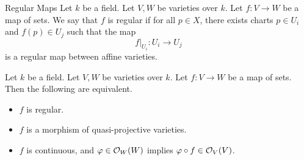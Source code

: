 \documentclass[a4paper]{article}
\begin{document}
\begin{defn}{Regular Maps}{} Let $k$ be a field. Let $V,W$ be varieties over $k$. Let $f:V\to W$ be a map of sets. We say that $f$ is regular if for all $p\in X$, there exists charts $p\in U_i$ and $f(p)\in U_j$ such that the map $$f|_{U_i}:U_i\to U_j$$ is a regular map between affine varieties. 
\end{defn}

\begin{prp}{}{} Let $k$ be a field. Let $V,W$ be varieties over $k$. Let $f:V\to W$ be a map of sets. Then the following are equivalent. 
\begin{itemize}
\item $f$ is regular. 
\item $f$ is a morphism of quasi-projective varieties. 
\item $f$ is continuous, and $\varphi\in\mathcal{O}_W(W)$ implies $\varphi\circ f\in\mathcal{O}_V(V)$. 
\end{itemize}
\end{prp}
\end{document}
